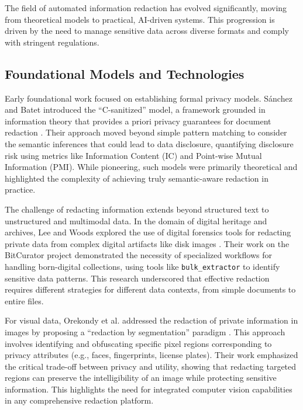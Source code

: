 \documentclass[conference]{IEEEtran}
\begin{document}
The field of automated information redaction has evolved significantly, moving from theoretical models to practical, AI-driven systems. This progression is driven by the need to manage sensitive data across diverse formats and comply with stringent regulations.

\subsection{Foundational Models and Technologies}
Early foundational work focused on establishing formal privacy models. S\'{a}nchez and Batet introduced the ``C-sanitized'' model, a framework grounded in information theory that provides a priori privacy guarantees for document redaction \cite{b11}. Their approach moved beyond simple pattern matching to consider the semantic inferences that could lead to data disclosure, quantifying disclosure risk using metrics like Information Content (IC) and Point-wise Mutual Information (PMI). While pioneering, such models were primarily theoretical and highlighted the complexity of achieving truly semantic-aware redaction in practice.

The challenge of redacting information extends beyond structured text to unstructured and multimodal data. In the domain of digital heritage and archives, Lee and Woods explored the use of digital forensics tools for redacting private data from complex digital artifacts like disk images \cite{b12}. Their work on the BitCurator project demonstrated the necessity of specialized workflows for handling born-digital collections, using tools like \texttt{bulk\_extractor} to identify sensitive data patterns. This research underscored that effective redaction requires different strategies for different data contexts, from simple documents to entire files.

For visual data, Orekondy et al. addressed the redaction of private information in images by proposing a ``redaction by segmentation'' paradigm \cite{b13}. This approach involves identifying and obfuscating specific pixel regions corresponding to privacy attributes (e.g., faces, fingerprints, license plates). Their work emphasized the critical trade-off between privacy and utility, showing that redacting targeted regions can preserve the intelligibility of an image while protecting sensitive information. This highlights the need for integrated computer vision capabilities in any comprehensive redaction platform.
\end{document}

